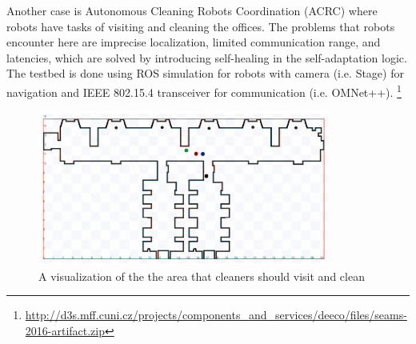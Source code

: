  
 Another case is Autonomous Cleaning  Robots  Coordination (ACRC) \cite{Matena2016Model} where robots have tasks of visiting and cleaning the offices. The problems that robots encounter here are imprecise localization, limited communication range, and latencies, which are solved by introducing self-healing in the self-adaptation logic. The testbed is done using ROS simulation for robots with camera (i.e. Stage) for navigation and IEEE 802.15.4 transceiver for communication (i.e. OMNet++). \footnote{\url{http://d3s.mff.cuni.cz/projects/components_and_services/deeco/files/seams-2016-artifact.zip}}
 
 \begin{figure}[!htb]
\centering
\includegraphics[scale=0.65]{figures/robots}
\caption{A visualization of the the area that cleaners should visit and clean}
\label{fig:robots}
\end{figure}

